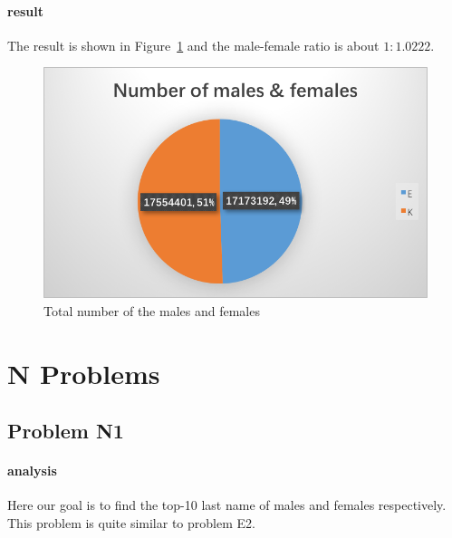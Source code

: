 \documentclass{article}
\begin{document}
\paragraph{result}
The result is shown in Figure~\ref{fig-mf} and the male-female ratio is about $1:1.0222$.
\begin{figure}[ht]
\centering
\includegraphics[width=0.5\linewidth]{E5}
\caption{Total number of the males and females}
\label{fig-mf}
\end{figure}


\section{N Problems}


\subsection{Problem N1}
\paragraph{analysis}
Here our goal is to find the top-10 last name of males and females respectively. This problem is quite similar to problem E2.
\end{document}
